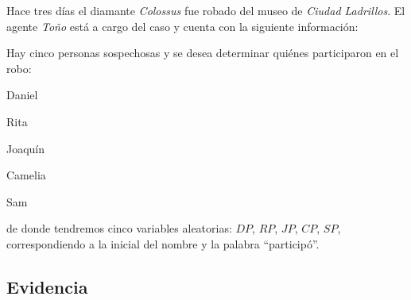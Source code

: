 Hace tres días el diamante \textit{Colossus} fue robado del museo de \textit{Ciudad Ladrillos}.  El agente \textit{Toño} está a cargo del caso y cuenta con la siguiente información:

Hay cinco personas sospechosas y se desea determinar quiénes participaron en el robo:
\begin{compactitem}
 \item Daniel
 \item Rita
 \item Joaquín
 \item Camelia
 \item Sam
\end{compactitem}
de donde tendremos cinco variables aleatorias: $DP$, $RP$, $JP$, $CP$, $SP$, correspondiendo a la inicial del nombre y la palabra ``participó''.

\subsection{Evidencia}

